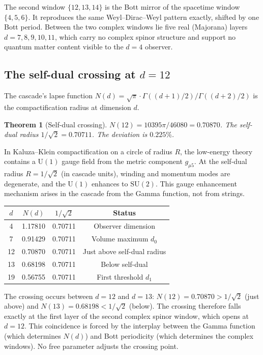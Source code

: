 \documentclass[12pt,a4paper]{article}
\newtheorem{theorem}{Theorem}[section]
\begin{document}
The second window $\{12,13,14\}$ is the Bott mirror of the spacetime window $\{4,5,6\}$.
It reproduces the same Weyl--Dirac--Weyl pattern exactly, shifted by one Bott period.
Between the two complex windows lie five real (Majorana) layers $d=7,8,9,10,11$, which
carry no complex spinor structure and support no quantum matter content visible to the $d=4$
observer.

\subsection{The self-dual crossing at $d=12$}

The cascade's lapse function $N(d)=\sqrt{\pi}\cdot\Gamma((d+1)/2)/\Gamma((d+2)/2)$ is the
compactification radius at dimension $d$.

\begin{theorem}[Self-dual crossing]\label{thm:self-dual}
$N(12)=10395\pi/46080=0.70870$. The self-dual radius $1/\sqrt{2}=0.70711$. The deviation
is $0.225\%$.
\end{theorem}

In Kaluza--Klein compactification on a circle of radius $R$, the low-energy theory contains
a $\mathrm{U}(1)$ gauge field from the metric component $g_{\mu 5}$. At the self-dual
radius $R=1/\sqrt{2}$ (in cascade units), winding and momentum modes are degenerate, and
the $\mathrm{U}(1)$ enhances to $\mathrm{SU}(2)$. This gauge enhancement mechanism arises
in the cascade from the Gamma function, not from strings.

\begin{center}
\begin{tabular}{cccc}
\toprule
$d$ & $N(d)$ & $1/\sqrt{2}$ & Status \\
\midrule
4   & 1.17810 & 0.70711 & Observer dimension \\
7   & 0.91429 & 0.70711 & Volume maximum $d_0$ \\
12  & 0.70870 & 0.70711 & Just above self-dual radius \\
13  & 0.68198 & 0.70711 & Below self-dual \\
19  & 0.56755 & 0.70711 & First threshold $d_1$ \\
\bottomrule
\end{tabular}
\end{center}

The crossing occurs between $d=12$ and $d=13$: $N(12)=0.70870>1/\sqrt{2}$ (just above)
and $N(13)=0.68198<1/\sqrt{2}$ (below). The crossing therefore falls exactly at the first
layer of the second complex spinor window, which opens at $d=12$. This coincidence is
forced by the interplay between the Gamma function (which determines $N(d)$) and Bott
periodicity (which determines the complex windows). No free parameter adjusts the crossing
point.
\end{document}
